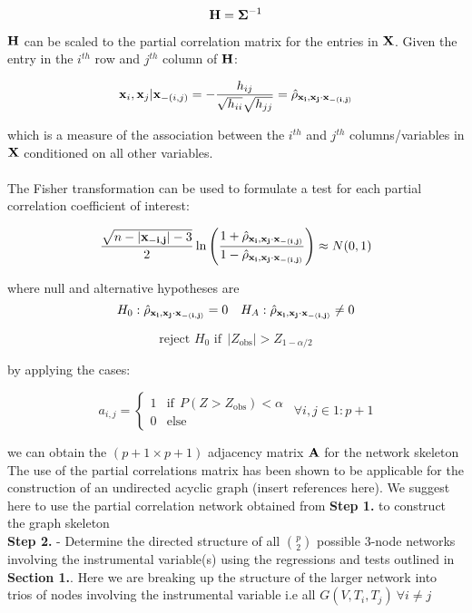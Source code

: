 \documentclass[12pt]{report}
\begin{document}
\[  {\bf H} = {\bf \Sigma}^{-1} \]

$\bf H$ can be scaled to the partial correlation matrix for the entries in $\bf X$. Given the entry in the $i^{th}$ row and $j^{th}$ column of $\bf H$:

\[  {\bf x}_i, {\bf x}_j | {\bf x}_{-(i,j)} = - \frac{h_{ij}}{\sqrt{h_{ii}}\sqrt{h_{jj}}} = \hat{\rho}_{\bf x_i,x_j\cdot x_{ -(i,j)}  }\]

which is a measure of the association between the $i^{th}$ and $j^{th}$ columns/variables in $\bf X$ conditioned on all other variables. \\
\\
The Fisher transformation can be used to formulate a test for each partial correlation coefficient of interest:

\[ \frac{\sqrt{n - |{\bf x_{-i,j}}| -3}}{2}\ln\left( \frac{1+\hat{\rho}_{\bf x_i,x_j\cdot x_{ -(i,j)}  }}{1-\hat{\rho}_{\bf x_i,x_j\cdot x_{ -(i,j)}  }} \right)  \approx N(0,1)\]

where null and alternative hypotheses are 
\[ H_0:  \hat{\rho}_{\bf x_i,x_j\cdot x_{ -(i,j)}  } = 0 \ \ \ H_A: \hat{\rho}_{\bf x_i,x_j\cdot x_{ -(i,j)}  }\neq 0\]

\[  \text{reject $H_0$ if} \ \  | Z_{\text{obs}}| > Z_{1-\alpha/2 }\]

by applying the cases:

\[  a_{i,j} = \begin{cases}1 & \text{if} \ \ P(Z>Z_{\text{obs}})<\alpha \\
                                      0 & \text{else} 
  \end{cases} \ \ \forall i,j \in 1:p+1\]

we can obtain the $(p+1 \times p+1)$ adjacency matrix $\bf A$ for the network skeleton\\


The use of the partial correlations matrix has been shown to be applicable for the construction of an undirected acyclic graph (insert references here). We suggest here to use the partial correlation network obtained from \textbf{Step 1.} to construct the graph skeleton\\


\noindent \textbf{Step 2.} - Determine the directed structure of all $p\choose 2$ possible 3-node networks involving the instrumental variable(s) using the regressions and tests outlined in \textbf{Section 1.}. Here we are breaking up the structure of the larger network into trios of nodes involving the instrumental variable i.e all $G(V, T_i, T_j) \ \forall i\neq j$\\
\end{document}
